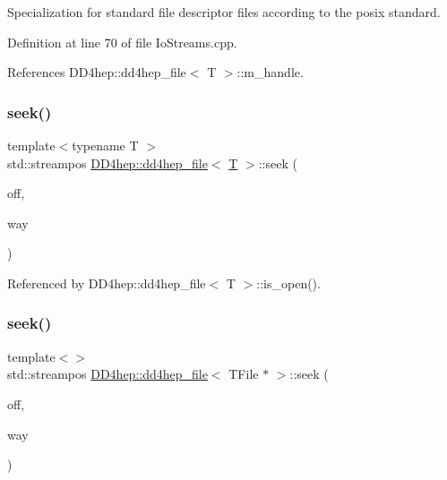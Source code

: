 Specialization for standard file descriptor files according to the posix standard. 



Definition at line 70 of file Io\+Streams.\+cpp.



References D\+D4hep\+::dd4hep\+\_\+file$<$ T $>$\+::m\+\_\+handle.

\hypertarget{class_d_d4hep_1_1dd4hep__file_a202c036e68f217e7a902819eb83ec2f3}{}\label{class_d_d4hep_1_1dd4hep__file_a202c036e68f217e7a902819eb83ec2f3} 
\subsubsection{\texorpdfstring{seek()}{seek()}\hspace{0.1cm}{\footnotesize\ttfamily [2/3]}}
{\footnotesize\ttfamily template$<$typename T $>$ \\
std\+::streampos \hyperlink{class_d_d4hep_1_1dd4hep__file}{D\+D4hep\+::dd4hep\+\_\+file}$<$ \hyperlink{class_t}{T} $>$\+::seek (\begin{DoxyParamCaption}\item[{\hyperlink{class_d_d4hep_1_1dd4hep__file_a28e1531542193871075e8b7f47818113}{stream\+\_\+offset}}]{off,  }\item[{B\+O\+O\+S\+T\+\_\+\+I\+O\+S\+::seekdir}]{way }\end{DoxyParamCaption})}



Referenced by D\+D4hep\+::dd4hep\+\_\+file$<$ T $>$\+::is\+\_\+open().

\hypertarget{class_d_d4hep_1_1dd4hep__file_a0cdbacb2c6bd80183636a18c711f3c13}{}\label{class_d_d4hep_1_1dd4hep__file_a0cdbacb2c6bd80183636a18c711f3c13} 
\subsubsection{\texorpdfstring{seek()}{seek()}\hspace{0.1cm}{\footnotesize\ttfamily [3/3]}}
{\footnotesize\ttfamily template$<$$>$ \\
std\+::streampos \hyperlink{class_d_d4hep_1_1dd4hep__file}{D\+D4hep\+::dd4hep\+\_\+file}$<$ T\+File $\ast$ $>$\+::seek (\begin{DoxyParamCaption}\item[{\hyperlink{class_d_d4hep_1_1dd4hep__file_a28e1531542193871075e8b7f47818113}{stream\+\_\+offset}}]{off,  }\item[{B\+O\+O\+S\+T\+\_\+\+I\+O\+S\+::seekdir}]{way }\end{DoxyParamCaption})}



